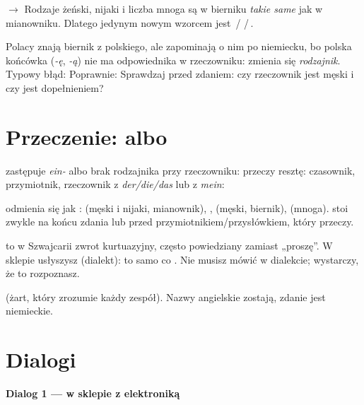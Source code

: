  $\rightarrow$  Rodzaje żeński, nijaki
i liczba mnoga są w bierniku \emph{takie same} jak w mianowniku. Dlatego jedynym nowym wzorcem jest
\,/\,\,/\,.

\begin{falle}
Polacy znają biernik z polskiego, ale zapominają o nim po niemiecku, bo polska końcówka (\emph{-ę}, \emph{-ą})
nie ma odpowiednika w rzeczowniku: zmienia się \emph{rodzajnik}. Typowy błąd: 
Poprawnie:  Sprawdzaj przed zdaniem: czy rzeczownik jest męski i czy jest
dopełnieniem?
\end{falle}

\section{Przeczenie:  albo }
\begin{zasada}
 zastępuje \emph{ein-} albo brak rodzajnika przy rzeczowniku:
   przeczy resztę: czasownik, przymiotnik, rzeczownik z \emph{der/die/das}
lub z \emph{mein}:  
\end{zasada}
 odmienia się jak :  (męski i nijaki, mianownik), ,  (męski, biernik),
 (mnoga).  stoi zwykle na końcu zdania lub przed przymiotnikiem/przysłówkiem, który przeczy.

\begin{szwajcaria}
 to w Szwajcarii zwrot kurtuazyjny, często powiedziany zamiast „proszę”. W sklepie
usłyszysz  (dialekt): to samo co . Nie musisz mówić
w dialekcie; wystarczy, że to rozpoznasz.
\end{szwajcaria}

\begin{praca}
  
(żart, który zrozumie każdy zespół). Nazwy angielskie zostają, zdanie jest niemieckie.
\end{praca}

\section{Dialogi}
\textbf{Dialog 1 --- w sklepie z elektroniką}
\begin{dialog}
\end{dialog}

